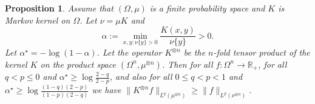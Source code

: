 \documentclass[11pt]{amsart}
\newcommand{\gas}{\alpha^{\star}}
\newcommand{\1}{\mathbf{1}}
\theoremstyle{definition}
\theoremstyle{plain}
\newtheorem{proposition}[example]{Proposition}
\theoremstyle{remark}
\numberwithin{equation}{section}
\begin{document}
\begin{proposition}\label{simrevhyp_strong_general}
Assume that $(\Omega, \mu)$ is a finite probability space and $K$ is Markov kernel on $\Omega$.
Let  $\nu = \mu K$ and
\begin{equation}
\alpha := \min_{ x, y: \nu\{y\} > 0} \frac{K(x, y)} { \nu\{y\}} > 0.  \label{min_atom}
\end{equation}
Let $\gas = -\log(1-\alpha)$.  Let the operator $K^{\otimes n}$ be the $n$-fold tensor product
of the kernel $K$  on the product space $(\Omega^n, \mu^{\otimes n})$.
Then for all $f : \Omega^n \to \mathbb R_+$, for all $q<p \leq 0$ and $\gas \geq \log \frac{2-q}{2-p}$, and also for all $0 \leq q<p<1$ and
$\gas \geq \log \frac{(1-q)(2-p)}{(1-p)(2-q)}$
we have
$\| K^{\otimes n} f\|_{L^q(\mu^{\otimes n})} \geq \| f\|_{L^p(\nu^{\otimes n})}$.
\end{proposition}
\end{document}
